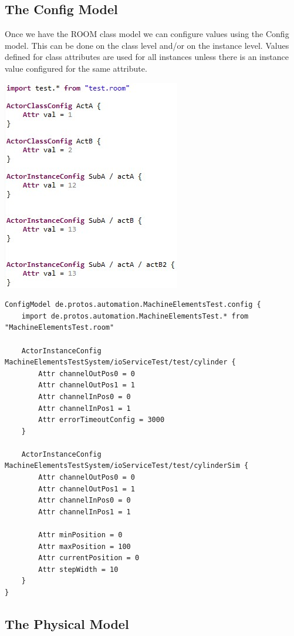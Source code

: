 \subsection{The Config Model}

Once we have the ROOM class model we can configure values using the Config model. This can be done on the 
class level and/or on the instance level. Values defined for class attributes are used for all instances 
unless there is an instance value configured for the same attribute.

\includegraphics{images/080-config.jpg}

\begin{lstlisting}[language=Config]
ConfigModel de.protos.automation.MachineElementsTest.config {
	import de.protos.automation.MachineElementsTest.* from "MachineElementsTest.room"
	
	ActorInstanceConfig MachineElementsTestSystem/ioServiceTest/test/cylinder {
		Attr channelOutPos0 = 0
		Attr channelOutPos1 = 1
		Attr channelInPos0 = 0
		Attr channelInPos1 = 1
		Attr errorTimeoutConfig = 3000
	}
	
	ActorInstanceConfig MachineElementsTestSystem/ioServiceTest/test/cylinderSim {
		Attr channelOutPos0 = 0
		Attr channelOutPos1 = 1
		Attr channelInPos0 = 0
		Attr channelInPos1 = 1

		Attr minPosition = 0
		Attr maxPosition = 100
		Attr currentPosition = 0
		Attr stepWidth = 10
	}
}\end{lstlisting}

\subsection{The Physical Model}

